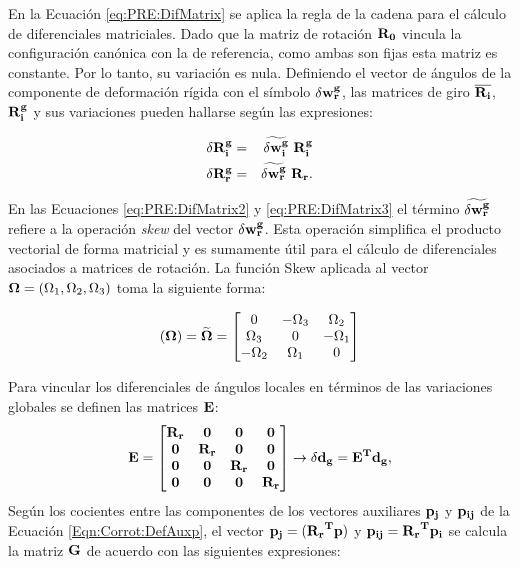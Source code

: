 En la Ecuación \eqref{eq:PRE:DifMatrix} se aplica la regla de la cadena para el cálculo de diferenciales matriciales. Dado que la matriz de rotación $\bf{R_0}$ vincula la configuración canónica con la de referencia, como ambas son fijas esta matriz es constante. Por lo tanto, su variación es nula. Definiendo el vector de ángulos de la componente de deformación rígida con el símbolo $\delta\bf{w}_r^g$, las matrices de giro $\overline{\bf{R_i}}$, $ \bf{R_i^g}$ y sus variaciones pueden hallarse según las expresiones:

\begin{eqnarray}
	\label{eq:PRE:DifMatrix2}
	\delta \bf{R_i^g} &=& \widetilde{\delta\bf{w}_i^g}~\bf{R}_i^g\\
	\label{eq:PRE:DifMatrix3}
	\delta \bf{R_r^g} &=& \widetilde{\delta\bf{w}_r^g}~\bf{R}_r.
\end{eqnarray}

En las Ecuaciones \eqref{eq:PRE:DifMatrix2} y \eqref{eq:PRE:DifMatrix3} el término $\widetilde{\delta\bf{w}_r^g}$ refiere a la operación \textit{skew} del vector $\delta\bf{w}_r^g$. Esta operación simplifica el producto vectorial de forma matricial y es sumamente útil para el cálculo de diferenciales asociados a matrices de rotación. La función \gls{Skew} aplicada al vector $\bf{\Omega}=\text{$(\Omega_1,\Omega_2,\Omega_3)$}$ toma la siguiente forma:

\begin{equation}\label{eq:PRE:Skew}
	(\bf{\Omega})=\widetilde{\bf{\Omega}}
	=
	\begin{bmatrix}
		0 &-\Omega_3  &\Omega_2   \\
		\Omega_3&0  & -\Omega_1  \\
		-\Omega_2  & \Omega_1 & 0
	\end{bmatrix}
\end{equation}

Para vincular los diferenciales de ángulos locales en términos de las variaciones globales se definen las matrices $\bf{E}$: 
\begin{equation}\label{Eqn:PRE:Corrot:DefE}
	\bf{E}=\begin{bmatrix}
		\bf{R_r}& \bf{0}   & \bf{0}   & \bf{0} \\
		\bf{0}  & \bf{R_r} & \bf{0}   & \bf{0}\\
		\bf{0}  & \bf{0}   & \bf{R_r} & \bf{0} \\
		\bf{0}  & \bf{0}   & \bf{0}   & \bf{R_r}
	\end{bmatrix}\rightarrow \delta \bf{d_g}=E^T \bf{d_g},
\end{equation}
 Según los cocientes entre las componentes de los vectores auxiliares $\bf{p}_j$ y $\bf{p_{ij}}$ de la Ecuación \eqref{Eqn:Corrot:DefAuxp}, el vector  $\bf{p_{j}}=(\bf{R_r}^T\bf{p})$ y  $\bf{p_{ij}}=\bf{R_r}^T\bf{p}_i$ se calcula la matriz $\bf{G}$ de acuerdo con las siguientes expresiones:

